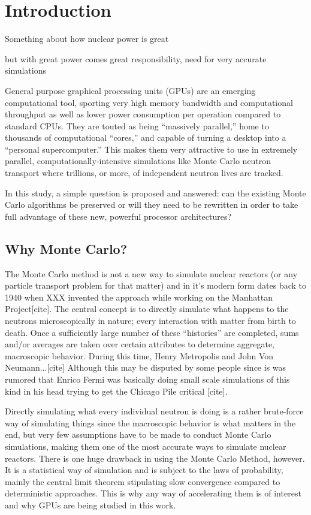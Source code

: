 \chapter{Introduction}

Something about how nuclear power is great

but with great power comes great responsibility, need for very accurate simulations

General purpose graphical processing units (GPUs) are an emerging computational tool, sporting very high memory bandwidth and computational throughput as well as lower power consumption per operation compared to standard CPUs.  They are touted as being ``massively parallel,'' home to thousands of computational ``cores,'' and capable of turning a desktop into a ``personal supercomputer.''  This makes them very attractive to use in extremely parallel, computationally-intensive simulations like Monte Carlo neutron transport where trillions, or more, of independent neutron lives are tracked.  

In this study, a simple question is proposed and answered: can the existing Monte Carlo algorithms be preserved or will they need to be rewritten in order to take full advantage of these new, powerful processor architectures?

\section{Why Monte Carlo?}

The Monte Carlo method is not a new way to simulate nuclear reactors (or any particle transport problem for that matter) and in it's modern form dates back to 1940 when XXX invented the approach while working on the Manhattan Project[cite].  The central concept is to directly simulate what happens to the neutrons microscopically in nature; every interaction with matter from birth to death.  Once a sufficiently large number of these ``histories'' are completed, sums and/or averages are taken over certain attributes to determine aggregate, macroscopic behavior.  During this time, Henry Metropolis and John Von Neumann...[cite]  Although this may be disputed by some people since is was rumored that Enrico Fermi was basically doing small scale simulations of this kind in his head trying to get the Chicago Pile critical [cite].

Directly simulating what every individual neutron is doing is a rather brute-force way of simulating things since the macroscopic behavior is what matters in the end, but very few assumptions have to be made to conduct Monte Carlo simulations, making them one of the most accurate ways to simulate nuclear reactors.  There is one huge drawback in using the Monte Carlo Method, however.  It is a statistical way of simulation and is subject to the laws of probability, mainly the central limit theorem stipulating slow convergence compared to deterministic approaches.  This is why any way of accelerating them is of interest and why GPUs are being studied in this work.

